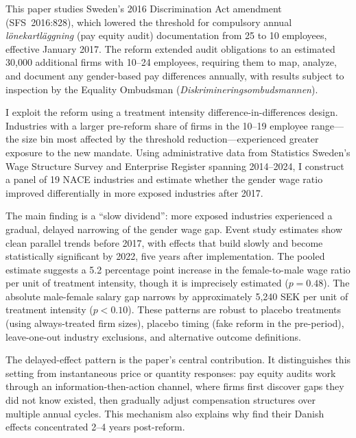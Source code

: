 \documentclass[12pt]{article}
\begin{document}
This paper studies Sweden's 2016 Discrimination Act amendment (SFS~2016:828), which lowered the threshold for compulsory annual \textit{l\"{o}nekartl\"{a}ggning} (pay equity audit) documentation from 25 to 10 employees, effective January 2017. The reform extended audit obligations to an estimated 30,000 additional firms with 10--24 employees, requiring them to map, analyze, and document any gender-based pay differences annually, with results subject to inspection by the Equality Ombudsman (\textit{Diskrimineringsombudsmannen}).

I exploit the reform using a treatment intensity difference-in-differences design. Industries with a larger pre-reform share of firms in the 10--19 employee range---the size bin most affected by the threshold reduction---experienced greater exposure to the new mandate. Using administrative data from Statistics Sweden's Wage Structure Survey and Enterprise Register spanning 2014--2024, I construct a panel of 19 NACE industries and estimate whether the gender wage ratio improved differentially in more exposed industries after 2017.

The main finding is a ``slow dividend'': more exposed industries experienced a gradual, delayed narrowing of the gender wage gap. Event study estimates show clean parallel trends before 2017, with effects that build slowly and become statistically significant by 2022, five years after implementation. The pooled estimate suggests a 5.2 percentage point increase in the female-to-male wage ratio per unit of treatment intensity, though it is imprecisely estimated ($p = 0.48$). The absolute male-female salary gap narrows by approximately 5,240 SEK per unit of treatment intensity ($p < 0.10$). These patterns are robust to placebo treatments (using always-treated firm sizes), placebo timing (fake reform in the pre-period), leave-one-out industry exclusions, and alternative outcome definitions.

The delayed-effect pattern is the paper's central contribution. It distinguishes this setting from instantaneous price or quantity responses: pay equity audits work through an information-then-action channel, where firms first discover gaps they did not know existed, then gradually adjust compensation structures over multiple annual cycles. This mechanism also explains why \citet{bennedsen2022firms} find their Danish effects concentrated 2--4 years post-reform.
\end{document}
